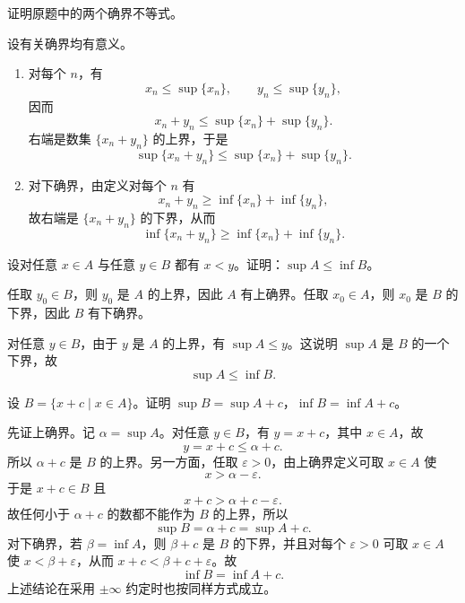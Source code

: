 \begin{xexercise}[3.1.3 练习题 5]
证明原题中的两个确界不等式。
\end{xexercise}
\begin{xsolution}
设有关确界均有意义。
\begin{enumerate}[label=(\arabic*)]
  \item 对每个 $n$，有
  \[
    x_n\leqslant\sup\{x_n\},\qquad
    y_n\leqslant\sup\{y_n\},
  \]
  因而
  \[
    x_n+y_n\leqslant\sup\{x_n\}+\sup\{y_n\}.
  \]
  右端是数集 $\{x_n+y_n\}$ 的上界，于是
  \[
    \sup\{x_n+y_n\}\leqslant\sup\{x_n\}+\sup\{y_n\}.
  \]

  \item 对下确界，由定义对每个 $n$ 有
  \[
    x_n+y_n\geqslant\inf\{x_n\}+\inf\{y_n\},
  \]
  故右端是 $\{x_n+y_n\}$ 的下界，从而
  \[
    \inf\{x_n+y_n\}\geqslant\inf\{x_n\}+\inf\{y_n\}.
  \]
\end{enumerate}
\end{xsolution}

\begin{xexercise}[3.1.3 练习题 6]
设对任意 $x\in A$ 与任意 $y\in B$ 都有 $x<y$。证明：$\sup A\leqslant\inf B$。
\end{xexercise}
\begin{xsolution}
任取 $y_0\in B$，则 $y_0$ 是 $A$ 的上界，因此 $A$ 有上确界。任取 $x_0\in A$，则 $x_0$ 是 $B$ 的下界，因此 $B$ 有下确界。

对任意 $y\in B$，由于 $y$ 是 $A$ 的上界，有 $\sup A\leqslant y$。这说明 $\sup A$ 是 $B$ 的一个下界，故
\[
  \sup A\leqslant\inf B.
\]
\end{xsolution}

\begin{xexercise}[3.1.3 练习题 7]
设 $B=\{x+c\mid x\in A\}$。证明 $\sup B=\sup A+c$，$\inf B=\inf A+c$。
\end{xexercise}
\begin{xsolution}
先证上确界。记 $\alpha=\sup A$。对任意 $y\in B$，有 $y=x+c$，其中 $x\in A$，故
\[
  y=x+c\leqslant\alpha+c.
\]
所以 $\alpha+c$ 是 $B$ 的上界。另一方面，任取 $\varepsilon>0$，由上确界定义可取 $x\in A$ 使
\[
  x>\alpha-\varepsilon.
\]
于是 $x+c\in B$ 且
\[
  x+c>\alpha+c-\varepsilon.
\]
故任何小于 $\alpha+c$ 的数都不能作为 $B$ 的上界，所以
\[
  \sup B=\alpha+c=\sup A+c.
\]
对下确界，若 $\beta=\inf A$，则 $\beta+c$ 是 $B$ 的下界，并且对每个 $\varepsilon>0$ 可取 $x\in A$ 使 $x<\beta+\varepsilon$，从而 $x+c<\beta+c+\varepsilon$。故
\[
  \inf B=\inf A+c.
\]
上述结论在采用 $\pm\infty$ 约定时也按同样方式成立。
\end{xsolution}

